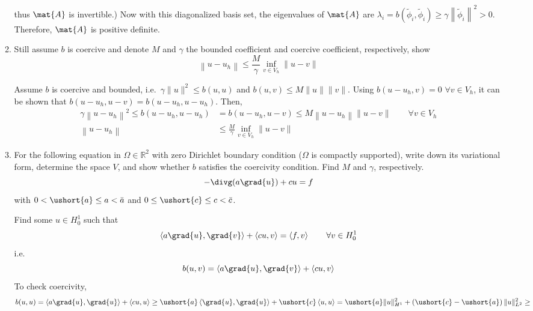 \documentclass{article}
\newcommand\NoIndent[1]{%
  \begingroup
  \par
  \parshape0
  #1\par
  \endgroup
}
\begin{document}
\begin{enumerate}
\begin{enumerate}
{	thus $\mat{A}$ is invertible.)
	Now with this diagonalized basis set, the eigenvalues of $\mat{A}$ are
	$\lambda_i = b\left(\tilde{\phi}_i,\tilde{\phi}_i\right)
		\geq \gamma\left\|\tilde{\phi}_i\right\|^2 > 0$.
	Therefore, $\mat{A}$ is positive definite.
}
			\item Still assume $b$ is coercive and denote $M$ and $\gamma$ the bounded coefficient and
				coercive coefficient, respectively, show
				\begin{equation*}
					\left\|u - u_h\right\| \leq \frac{M}{\gamma}\inf_{v\in V_h}\|u - v\|
				\end{equation*}
\NoIndent{
	Assume $b$ is coercive and bounded, i.e.\ $\gamma\|u\|^2 \leq b(u,u)$ and $b(u,v) \leq M \|u\|\|v\|$.
	Using $b\left(u-u_h,v\right) = 0$ $\forall v \in V_h$, it can be shown that
	$b\left(u-u_h,u-v\right) = b\left(u-u_h,u-u_h\right)$.
	Then,
	\begin{align*}
		\gamma\left\|u-u_h\right\|^2 \leq b\left(u-u_h,u-u_h\right) &= b\left(u-u_h,u-v\right)
			\leq M \left\|u-u_h\right\|\|u-v\| \qquad \forall v \in V_h \\
		\left\|u - u_h\right\| &\leq \frac{M}{\gamma}\inf_{v\in V_h}\|u - v\|
	\end{align*}
}
			\item For the following equation in $\Omega \in \mathbb{R}^2$
				with zero Dirichlet boundary condition ($\Omega$ is compactly supported),
				write down its variational form, determine the space $V$,
				and show whether $b$ satisfies the coercivity condition.
				Find $M$ and $\gamma$, respectively.
				\begin{equation*}
					-\divg(a\grad{u}) + cu = f
				\end{equation*}
				with $0 < \ushort{a} \leq a < \bar{a}$ and $0 \leq \ushort{c} \leq c < \bar{c}$.
\NoIndent{
	Find some $u \in H_0^1$ such that
	\begin{equation*}
		\left<a\grad{u},\grad{v}\right> + \left<cu,v\right> = \left<f,v\right> \qquad \forall v \in H_0^1
	\end{equation*}
	i.e.
	\begin{equation*}
		b(u,v) = \left<a\grad{u},\grad{v}\right> + \left<cu,v\right>
	\end{equation*}
	To check coercivity,
	\begin{equation*}
		b(u,u) = \left<a\grad{u},\grad{u}\right> + \left<cu,u\right> \geq
			\ushort{a}\left<\grad{u},\grad{u}\right> + \ushort{c}\left<u,u\right> =
			\ushort{a}\|u\|_{H^1}^2 + \left(\ushort{c}-\ushort{a}\right)\|u\|_{L^2}^2 \geq

\end{equation*}}
\end{enumerate}
\end{enumerate}
\end{document}
